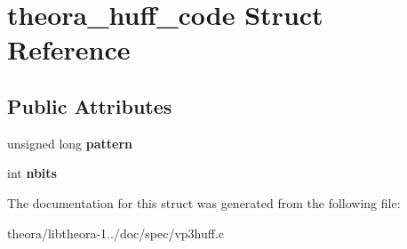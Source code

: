 \hypertarget{structtheora__huff__code}{\section{theora\+\_\+huff\+\_\+code Struct Reference}
\label{structtheora__huff__code}
}
\subsection*{Public Attributes}
\begin{DoxyCompactItemize}
\item 
\hypertarget{structtheora__huff__code_a23de170aa24d6d1113a5eb5a7619aedf}{unsigned long {\bfseries pattern}}\label{structtheora__huff__code_a23de170aa24d6d1113a5eb5a7619aedf}

\item 
\hypertarget{structtheora__huff__code_a408084c979111fbd0edc2ff0475d5028}{int {\bfseries nbits}}\label{structtheora__huff__code_a408084c979111fbd0edc2ff0475d5028}

\end{DoxyCompactItemize}


The documentation for this struct was generated from the following file\+:\begin{DoxyCompactItemize}
\item 
theora/libtheora-\/1../doc/spec/vp3huff.\+c\end{DoxyCompactItemize}
